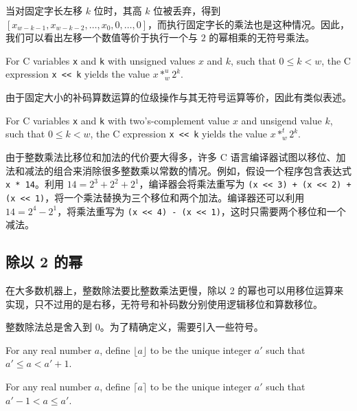 当对固定字长左移 $k$ 位时，其高 $k$ 位被丢弃，得到 $[x_{w-k-1}, x_{w-k-2}, \dots, x_0, 0, \dots, 0]$，而执行固定字长的乘法也是这种情况。因此，我们可以看出左移一个数值等价于执行一个与 $2$ 的幂相乘的无符号乘法。

\begin{theorem}
    For C variables \verb|x| and \verb|k| with unsigned values $x$ and $k$, such that $0 \leq k < w$, the C expression \verb|x << k| yields the value $x *^u_w 2^k$.
\end{theorem}

由于固定大小的补码算数运算的位级操作与其无符号运算等价，因此有类似表述。

\begin{theorem}
    For C variables \verb|x| and \verb|k| with two's-complement value $x$ and unsigend value $k$, such that $0 \leq k < w$, the C expression \verb|x << k| yields the value $x *^t_w 2^k$.
\end{theorem}

由于整数乘法比移位和加法的代价要大得多，许多 C 语言编译器试图以移位、加法和减法的组合来消除很多整数乘以常数的情况。例如，假设一个程序包含表达式 \verb|x * 14|。利用 $14 = 2^3 + 2^2 + 2^1$，编译器会将乘法重写为 \verb|(x << 3) + (x << 2) + (x << 1)|，将一个乘法替换为三个移位和两个加法。编译器还可以利用 $14 = 2^4 - 2^1$，将乘法重写为 \verb|(x << 4) - (x << 1)|，这时只需要两个移位和一个减法。

\subsection{除以 2 的幂}

在大多数机器上，整数除法要比整数乘法更慢，除以 2 的幂也可以用移位运算来实现，只不过用的是右移，无符号和补码数分别使用逻辑移位和算数移位。

整数除法总是舍入到 0。为了精确定义，需要引入一些符号。

\begin{definition}
    For any real number $a$, define $\lfloor a \rfloor$ to be the unique integer $a'$ such that $a' \leq a < a' + 1$.
\end{definition}

\begin{definition}
    For any real number $a$, define $\lceil a \rceil$ to be the unique integer $a'$ such that $a' - 1 < a \leq a'$.
\end{definition}
\endinput
